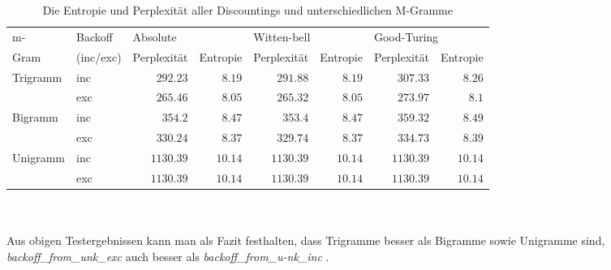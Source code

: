 \begin{table}[h]
  \begin{center}
  \small\addtolength{\tabcolsep}{-5pt}
    \begin{tabular}{l|l|r|r|r|r|r|r}
     \toprule
     m- &Backoff &\multicolumn{2}{|l|}{Absolute}&\multicolumn{2}{|l|}{Witten-bell}&\multicolumn{2}{l}{Good-Turing}\\
	  \cline{3-8}
	  Gram&(inc/exc)&Perplexit\"at&Entropie&Perplexit\"at&Entropie&Perplexit\"at&Entropie\\
    \hline
    \hline
		Trigramm &inc 	& $292.23$ 	& $8.19$ 	& $291.88$ 	& $8.19$ 	& $307.33$ 	& $8.26$\\
				 		 &exc		& $265.46$ 	& $8.05$ 	& $265.32$ 	& $8.05$ 	& $273.97$ 	& $8.1$\\
		\hline
		Bigramm  &inc 	& $354.2$ 	& $8.47$ 	& $353.4$ 	& $8.47$ 	& $359.32$ 	& $8.49$\\
				 		 &exc		& $330.24$ 	& $8.37$ 	& $329.74$ 	& $8.37$ 	& $334.73$ 	& $8.39$\\
		\hline
		Unigramm &inc 	& $1130.39$ & $10.14$ & $1130.39$ & $10.14$ & $1130.39$ & $10.14$\\
				 		 &exc		& $1130.39$ & $10.14$ & $1130.39$ & $10.14$ & $1130.39$ & $10.14$\\
     \bottomrule
    \end{tabular}
  \end{center}
     \caption{Die Entropie und Perplexit\"at aller Discountings und unterschiedlichen M-Gramme}
\label{tab:table_3}
\end{table}
\\
\\
Aus obigen Testergebnissen kann man als Fazit festhalten, dass Trigramme besser als Bigramme sowie Unigramme sind, \emph{backoff\_from\_unk\_exc} auch besser als \emph{backoff\_from\_u-nk\_inc} . 